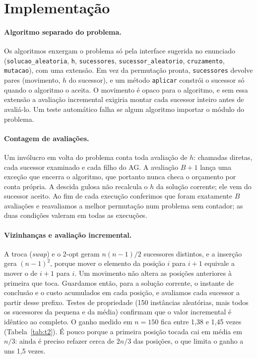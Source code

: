 \section{Implementação}
\label{sec:implementacao}

\paragraph{Algoritmo separado do problema.}
Os algoritmos enxergam o problema só pela interface sugerida no enunciado (\texttt{solucao\_aleatoria}, \texttt{h}, \texttt{sucessores}, \texttt{sucessor\_aleatorio}, \texttt{cruzamento}, \texttt{mutacao}), com uma extensão.
Em vez da permutação pronta, \texttt{sucessores} devolve pares (movimento, $h$ do sucessor), e um método \texttt{aplicar} constrói o sucessor só quando o algoritmo o aceita.
O movimento é opaco para o algoritmo, e sem essa extensão a avaliação incremental exigiria montar cada sucessor inteiro antes de avaliá-lo.
Um teste automático falha se algum algoritmo importar o módulo do problema.

\paragraph{Contagem de avaliações.}
Um invólucro em volta do problema conta toda avaliação de $h$: chamadas diretas, cada sucessor examinado e cada filho do AG.
A avaliação $B+1$ lança uma exceção que encerra o algoritmo, que portanto nunca checa o orçamento por conta própria.
A descida gulosa não recalcula o $h$ da solução corrente; ele vem do sucessor aceito.
Ao fim de cada execução conferimos que foram exatamente $B$ avaliações e reavaliamos a melhor permutação num problema sem contador; as duas condições valeram em todas as execuções.

\paragraph{Vizinhanças e avaliação incremental.}
A troca (\textit{swap}) e o 2-opt geram $n(n-1)/2$ sucessores distintos, e a inserção gera $(n-1)^2$, porque mover o elemento da posição $i$ para $i+1$ equivale a mover o de $i+1$ para $i$.
Um movimento não altera as posições anteriores à primeira que toca.
Guardamos então, para a solução corrente, o instante de conclusão e o custo acumulados em cada posição, e avaliamos cada sucessor a partir desse prefixo.
Testes de propriedade (150 instâncias aleatórias, mais todos os sucessores da pequena e da média) confirmam que o valor incremental é idêntico ao completo.
O ganho medido em $n = 150$ fica entre 1,38 e 1,45 vezes (Tabela~\ref{tab:t2}).
É pouco porque a primeira posição tocada cai em média em $n/3$: ainda é preciso refazer cerca de $2n/3$ das posições, o que limita o ganho a uns 1,5 vezes.

